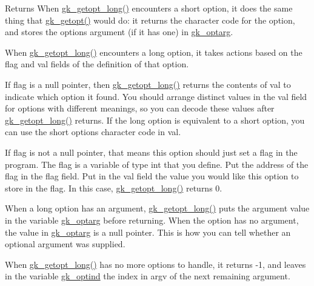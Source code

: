 \begin{DoxyReturn}{Returns}
When \hyperlink{a00038_a1c3b8d80bd9620dc66f24d4854c0f6d3}{gk\+\_\+getopt\+\_\+long()} encounters a short option, it does the same thing that \hyperlink{a00038_af82cf3b0fb9ec4411a987f02df3b2e47}{gk\+\_\+getopt()} would do\+: it returns the character code for the option, and stores the options argument (if it has one) in \hyperlink{a00038_a7e251e946564d7de41aa8f602b94e74e}{gk\+\_\+optarg}.

When \hyperlink{a00038_a1c3b8d80bd9620dc66f24d4854c0f6d3}{gk\+\_\+getopt\+\_\+long()} encounters a long option, it takes actions based on the flag and val fields of the definition of that option.

If flag is a null pointer, then \hyperlink{a00038_a1c3b8d80bd9620dc66f24d4854c0f6d3}{gk\+\_\+getopt\+\_\+long()} returns the contents of val to indicate which option it found. You should arrange distinct values in the val field for options with different meanings, so you can decode these values after \hyperlink{a00038_a1c3b8d80bd9620dc66f24d4854c0f6d3}{gk\+\_\+getopt\+\_\+long()} returns. If the long option is equivalent to a short option, you can use the short option\textquotesingle{}s character code in val.

If flag is not a null pointer, that means this option should just set a flag in the program. The flag is a variable of type int that you define. Put the address of the flag in the flag field. Put in the val field the value you would like this option to store in the flag. In this case, \hyperlink{a00038_a1c3b8d80bd9620dc66f24d4854c0f6d3}{gk\+\_\+getopt\+\_\+long()} returns 0.

When a long option has an argument, \hyperlink{a00038_a1c3b8d80bd9620dc66f24d4854c0f6d3}{gk\+\_\+getopt\+\_\+long()} puts the argument value in the variable \hyperlink{a00038_a7e251e946564d7de41aa8f602b94e74e}{gk\+\_\+optarg} before returning. When the option has no argument, the value in \hyperlink{a00038_a7e251e946564d7de41aa8f602b94e74e}{gk\+\_\+optarg} is a null pointer. This is how you can tell whether an optional argument was supplied.

When \hyperlink{a00038_a1c3b8d80bd9620dc66f24d4854c0f6d3}{gk\+\_\+getopt\+\_\+long()} has no more options to handle, it returns -\/1, and leaves in the variable \hyperlink{a00038_ab70fc0e7e22192b687bd0d377bf61e32}{gk\+\_\+optind} the index in argv of the next remaining argument. 
\end{DoxyReturn}
\mbox{\label{a00050_a26fc3b9b5c3c4973ee60c3f1daeb02cd}} 
